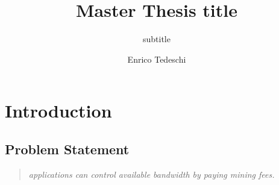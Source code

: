 \documentclass[USenglish]{uit-thesis}
\renewcommand{\bibname}{References}
\begin{document}
\renewcommand{\bibname}{References}

\title{Master Thesis title}
\subtitle{subtitle}			%
\author{Enrico Tedeschi}

\maketitle

\frontmatter



\begin{abstract}
\label{sec:abstract}

\end{abstract}

%

\tableofcontents

\listofdefinition

\mainmatter
\chapter{Introduction}
\label{chap:introduction}

\section{Problem Statement}
\label{sec:probdefinition}


\begin{quote}
\emph
{applications can control available bandwidth by paying mining fees.}
\end{quote}
\end{document}
